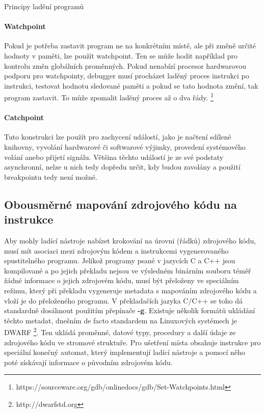 \documentclass[czech,bachelor,male,python,dept460]{diploma}						%
\begin{document}
\begin{section}{Principy ladění programů}
		\paragraph*{Watchpoint}
			Pokud je potřeba zastavit program ne na konkrétním místě, ale při změně určité hodnoty v paměti, lze použít watchpoint. Ten se může hodit například pro
			kontrolu změn globálních proměnných. Pokud nenabízí procesor hardwarovou podporu pro watchpointy, debugger musí procházet laděný proces instrukci po
			instrukci, testovat hodnotu sledované paměti a pokud se tato hodnota změní, tak program zastavit. To může zpomalit laděný proces až o
			dva řády. \footnote{https://sourceware.org/gdb/onlinedocs/gdb/Set-Watchpoints.html}
		\paragraph*{Catchpoint}
			Tuto konstrukci lze použít pro zachycení událostí, jako je načtení sdílené knihovny, vyvolání hardwarové či softwarové výjimky, provedení
			systémového volání anebo přijetí signálu. Většina těchto událostí je ze své podstaty asynchronní, nelze u nich tedy dopředu určit, kdy budou zavolány
			a použití breakpointu tedy není možné.	
		
	\subsection{Obousměrné mapování zdrojového kódu na instrukce}
		Aby mohly ladící nástroje nabízet krokování na úrovni (řádků) zdrojového kódu, musí mít asociaci mezi zdrojovým kódem a instrukcemi vygenerovaného
		spustitelného programu. Jelikož programy psané v jazycích C a C++ jsou kompilované a po jejich překladu nejsou
		ve výsledném binárním souboru téměř žádné informace o jejich zdrojovém kódu, musí být přeloženy ve speciálním režimu, který při překladu vygeneruje
		metadata s mapováním zdrojového kódu a vloží je do přeloženého programu. V překladačích jazyka C/C++ se toho dá standardně dosáhnout použitím
		přepínače \textbf{-g}. Existuje několik formátů ukládání těchto metadat, dnešním de facto standardem na Linuxových systémech je DWARF
		\footnote{http://dwarfstd.org}. Ten ukládá proměnné, datové typy, procedury a další údaje ze zdrojového kódu ve stromové struktuře.
		Pro ušetření místa obsahuje instrukce pro speciální konečný automat, který implementují ladící nástroje a pomocí něho poté získávají
		informace o původním zdrojovém kódu.
		

\end{section}
\end{document}
